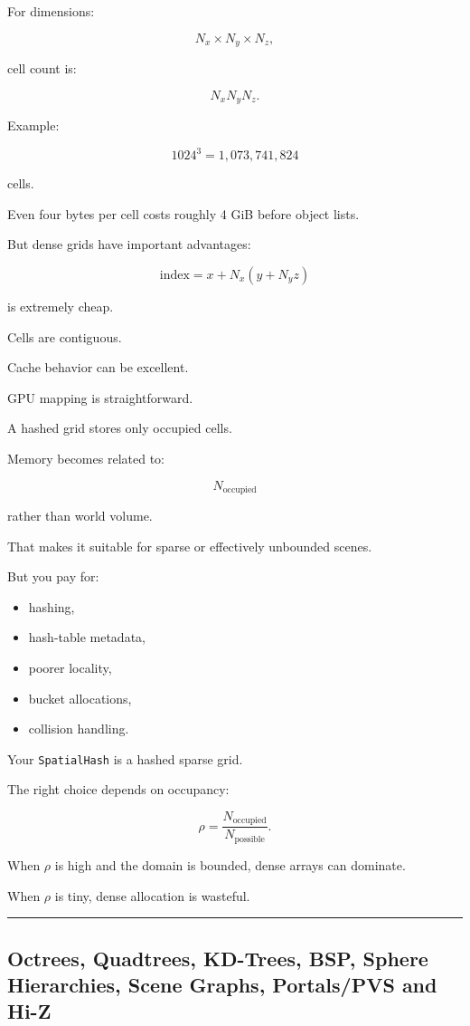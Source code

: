 For dimensions:

\[
N_x\times N_y\times N_z,
\]

cell count is:

\[
N_xN_yN_z.
\]

Example:

\[
1024^3
=
1,073,741,824
\]

cells.

Even four bytes per cell costs roughly 4 GiB before object lists.

But dense grids have important advantages:

\[
\text{index}
=
x+N_x(y+N_yz)
\]

is extremely cheap.

Cells are contiguous.

Cache behavior can be excellent.

GPU mapping is straightforward.

A hashed grid stores only occupied cells.

Memory becomes related to:

\[
N_{\text{occupied}}
\]

rather than world volume.

That makes it suitable for sparse or effectively unbounded scenes.

But you pay for:

\begin{itemize}
\tightlist
\item
  hashing,
\item
  hash-table metadata,
\item
  poorer locality,
\item
  bucket allocations,
\item
  collision handling.
\end{itemize}

Your \texttt{SpatialHash} is a hashed sparse grid.

The right choice depends on occupancy:

\[
\rho=
\frac{N_{\text{occupied}}}
{N_{\text{possible}}}.
\]

When \(\rho\) is high and the domain is bounded, dense arrays can dominate.

When \(\rho\) is tiny, dense allocation is wasteful.

\begin{center}\rule{0.5\linewidth}{0.5pt}\end{center}

\subsection{Octrees, Quadtrees, KD-Trees, BSP, Sphere Hierarchies, Scene Graphs, Portals/PVS and Hi-Z}\label{06-engine-ii-ch029-octrees-quadtrees-kd-trees-bsp-sphere-hierarchies-scene-graphs-portalspvs-and-hi-z}

